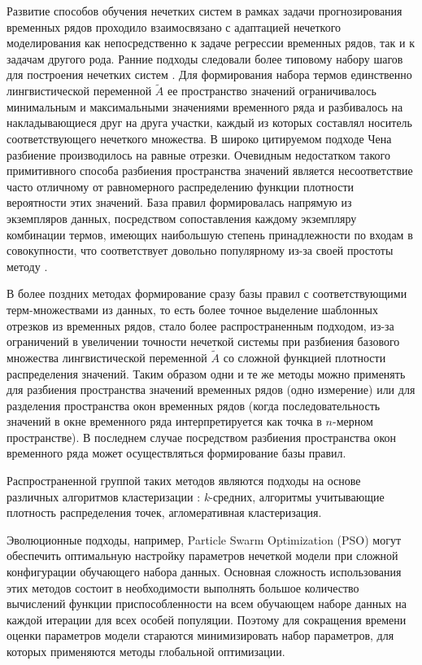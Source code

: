 Развитие способов обучения нечетких систем в рамках задачи прогнозирования временных рядов проходило взаимосвязано с адаптацией нечеткого моделирования как непосредственно к задаче регрессии временных рядов, так и к задачам другого рода. Ранние подходы следовали более типовому набору шагов для построения нечетких систем \cite{Chellai2022}. Для формирования набора термов единственно лингвистической переменной $\tilde{A}$ ее пространство значений ограничивалось минимальным и максимальными значениями временного ряда и разбивалось на накладывающиеся друг на друга участки, каждый из которых составлял носитель соответствующего нечеткого множества. В широко цитируемом подходе Чена \cite{Chen1996} разбиение производилось на равные отрезки. Очевидным недостатком такого примитивного способа разбиения пространства значений является несоответствие часто отличному от равномерного распределению функции плотности вероятности этих значений. База правил формировалась напрямую из экземпляров данных, посредством сопоставления каждому экземпляру комбинации термов, имеющих наибольшую степень принадлежности по входам в совокупности, что соответствует довольно популярному из-за своей простоты методу \cite{Wang1992}.

В более поздних методах формирование сразу базы правил с соответствующими терм-множествами из данных, то есть более точное выделение шаблонных отрезков из временных рядов, стало более распространенным подходом, из-за ограничений в увеличении точности нечеткой системы при разбиения базового множества лингвистической переменной $\tilde{A}$ со сложной функцией плотности распределения значений. Таким образом одни и те же методы можно применять для разбиения пространства значений временных рядов (одно измерение) или для разделения пространства окон временных рядов (когда последовательность значений в окне временного ряда интерпретируется как точка в $n$-мерном пространстве). В последнем случае посредством разбиения пространства окон временного ряда может осуществляться формирование базы правил.

Распространенной группой таких методов являются подходы на основе различных алгоритмов кластеризации \cite{Lucas2021}:  \textit{k}-средних, алгоритмы учитывающие плотность распределения точек, агломеративная кластеризация.

Эволюционные подходы, например, Particle Swarm Optimization (PSO)\cite{Davari2009} могут обеспечить оптимальную настройку параметров нечеткой модели при сложной конфигурации обучающего набора данных. Основная сложность использования этих методов состоит в необходимости выполнять большое количество вычислений функции приспособленности на всем обучающем наборе данных на каждой итерации для всех особей популяции. Поэтому для сокращения времени оценки параметров модели стараются минимизировать набор параметров, для которых применяются методы глобальной оптимизации.

